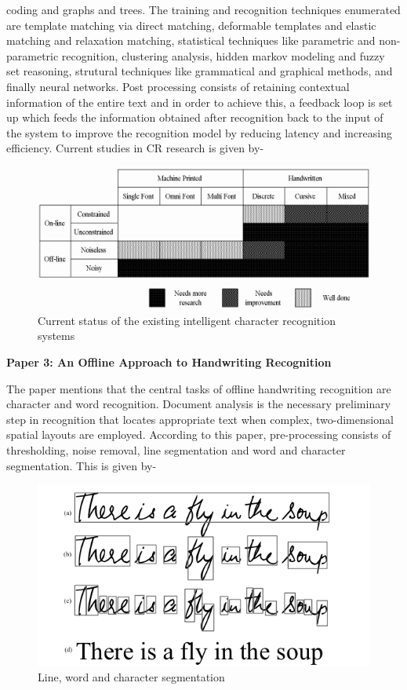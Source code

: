\documentclass[main.tex]{subfiles}
\begin{document}
coding and graphs and trees. The training and recognition techniques enumerated
are template matching via direct matching, deformable templates and elastic
matching and relaxation matching, statistical techniques like parametric and
non-parametric recognition, clustering analysis, hidden markov modeling and fuzzy
set reasoning, strutural techniques like grammatical and graphical methods, and
finally neural networks. Post processing consists of retaining contextual
information of the entire text and in order to achieve this, a feedback loop is
set up which feeds the information obtained after recognition back to the input
of the system to improve the recognition model by reducing latency and
increasing efficiency. Current studies in CR research is given by-
\begin{figure}[H]
	\includegraphics[width=\linewidth]{figures/figure-2.png}
	\caption{Current status of the existing intelligent character recognition
	systems}
	\label{fig2}
\end{figure}
\begin{flushleft}
\bf{Paper 3: An Offline Approach to Handwriting Recognition}
\end{flushleft}
\vspace{1.5mm}
The paper mentions that the central tasks of offline handwriting recognition are
character and word recognition. Document analysis is the necessary preliminary
step in recognition that locates appropriate text when complex, two-dimensional
spatial layouts are employed. According to this paper, pre-processing consists
of thresholding, noise removal, line segmentation and word and character
segmentation. This is given by-
\begin{figure}[H]
	\includegraphics[width=\linewidth]{figures/figure-3.png}
	\caption{Line, word and character segmentation}
	\label{fig3}
\end{figure}
\end{document}
